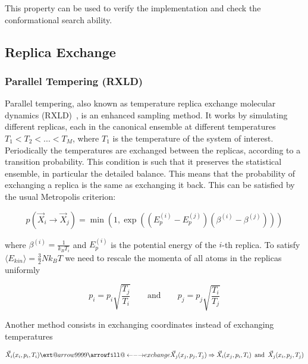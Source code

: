 \documentclass[a4paper]{article}
\makeatletter
\newcommand\xleftrightarrow[2][]{%
  \ext@arrow 9999{\longleftrightarrowfill@}{#1}{#2}}
\newcommand\longleftrightarrowfill@{%
  \arrowfill@\leftarrow\relbar\rightarrow}
\makeatother
\begin{document}
This property can be used to verify the implementation and check the conformational search ability.

\subsection{Replica Exchange}

\subsubsection{Parallel Tempering (RXLD)}

Parallel tempering, also known as temperature replica exchange molecular dynamics (RXLD)~\cite{YujiSugita1999}, is an enhanced sampling method. It works by simulating different replicas, each in the canonical ensemble at different temperatures $T_1 < T_2 < ... < T_M$, where $T_1$ is the temperature of the system of interest. Periodically the temperatures are exchanged between the replicas, according to a transition probability. This condition is such that it preserves the statistical ensemble, in particular the detailed balance. This means that the probability of exchanging a replica is the same as exchanging it back. This can be satisfied by the usual Metropolis criterion:

\begin{equation}
p \left( \vec{X}_i \rightarrow \vec{X}_j \right) = \min \left( 1, \exp \left( \left( E_p^{(i)} - E_p^{(j)} \right)  \left( \beta^{(i)} - \beta^{(j)} \right)  \right) \right)
\label{eq:parallel}
\end{equation}

where $\beta^{(i)} = \frac{1}{k_B T_i}$ and $E_p^{(i)}$ is the potential energy of the $i$-th replica. To satisfy $\langle E_{kin} \rangle = \frac{3}{2} N k_B T$ we need to rescale the momenta of all atoms in the replicas uniformly

\begin{equation}
p_i = p_i \sqrt{\frac{T_j}{T_i}} \qquad \text{and} \qquad p_j = p_j \sqrt{\frac{T_i}{T_j}}
\end{equation}

Another method consists in  exchanging coordinates instead of exchanging temperatures

\begin{equation}
\vec{X}_i(x_i, p_i, T_i) \xleftrightarrow{exchange} \vec{X}_j(x_j, p_j, T_j) \Rightarrow \vec{X}_i(x_j, p_i, T_i) \enspace \text{and} \enspace \vec{X}_j(x_i, p_j, T_j)
\end{equation}
\end{document}
